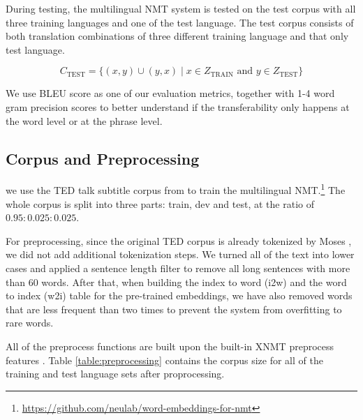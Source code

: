 \documentclass[thesis,fonts=libertine]{cluu}
\begin{document}
During testing, the multilingual NMT system is tested on the test corpus with all three training languages and one of the test language. The test corpus consists of both translation combinations of three different training language and that only test language.

\begin{equation*}
  C_{\text{TEST}} = \{(x, y)\cup(y,x) \mid x \in Z_{\text{TRAIN}} \text{ and } y \in Z_{\text{TEST}}\}
\end{equation*}

We use BLEU score \parencite{papineni-etal-2002-bleu} as one of our evaluation metrics, together with 1-4 word gram precision scores to better understand if the transferability only happens at the word level or at the phrase level.

\subsection{Corpus and Preprocessing}

we use the TED talk subtitle corpus from \textcite{Qi:2018aa} to train the multilingual NMT.\footnote{\url{https://github.com/neulab/word-embeddings-for-nmt}} The whole corpus is split into three parts: train, dev and test, at the ratio of $0.95:0.025:0.025$.

For preprocessing, since the original TED corpus is already tokenized by Moses \parencite{koehn-etal-2007-moses}, we did not add additional tokenization steps. We turned all of the text into lower cases and applied a sentence length filter to remove all long sentences with more than 60 words. After that, when building the index to word (i2w) and the word to index (w2i) table for the pre-trained embeddings, we have also removed words that are less frequent than two times to prevent the system from overfitting to rare words.

All of the preprocess functions are built upon the built-in XNMT preprocess features \parencite{Neubig:2018aa}. Table \ref{table:preprocessing} contains the corpus size for all of the training and test language sets after proprocessing.
\end{document}
